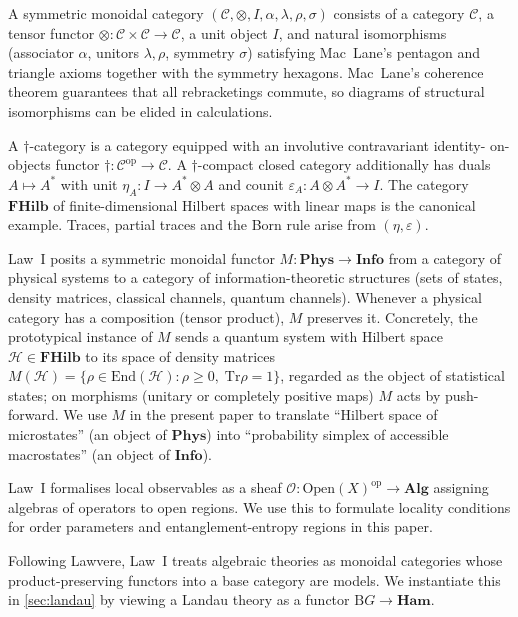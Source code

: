 \documentclass[12pt]{article}
\theoremstyle{plain}
\theoremstyle{definition}
\theoremstyle{remark}
\newcommand{\Ham}{\mathbf{Ham}}
\newcommand{\FHilb}{\mathbf{FHilb}}
\newcommand{\Phys}{\mathbf{Phys}}
\newcommand{\Info}{\mathbf{Info}}
\newcommand{\BG}{\mathrm{B}G}
\newcommand{\Tr}{\mathrm{Tr}}
\begin{document}
\begin{description}[leftmargin=1.5em,style=nextline]
  \item[(L1.1) Symmetric monoidal category]
  A symmetric monoidal category $(\mathcal{C},\otimes,I,\alpha,\lambda,\rho,\sigma)$
  consists of a category $\mathcal{C}$, a tensor functor
  ${\otimes:\mathcal{C}\times\mathcal{C}\to\mathcal{C}}$, a unit object $I$, and natural
  isomorphisms (associator $\alpha$, unitors $\lambda,\rho$, symmetry $\sigma$)
  satisfying Mac~Lane's pentagon and triangle axioms together with the symmetry
  hexagons. Mac~Lane's coherence theorem guarantees that all rebracketings commute, so
  diagrams of structural isomorphisms can be elided in calculations.

  \item[(L1.2) Dagger-compact closed structure]
  A $\dagger$-category is a category equipped with an involutive contravariant identity-
  on-objects functor $\dagger:\mathcal{C}^{\mathrm{op}}\to\mathcal{C}$. A
  $\dagger$-compact closed category additionally has duals
  $A\mapsto A^{*}$ with unit $\eta_{A}:I\to A^{*}\otimes A$ and counit
  $\varepsilon_{A}:A\otimes A^{*}\to I$. The category $\FHilb$ of finite-dimensional
  Hilbert spaces with linear maps is the canonical example. Traces, partial traces and
  the Born rule arise from $(\eta,\varepsilon)$.

  \item[(L1.3) Matter--information functor]
  Law~I posits a symmetric monoidal functor
  $M:\Phys\to\Info$
  from a category of physical systems to a category of information-theoretic structures
  (sets of states, density matrices, classical channels, quantum channels). Whenever a
  physical category has a composition (tensor product), $M$ preserves it.
  Concretely, the prototypical instance of $M$ sends a quantum system with Hilbert
  space $\mathcal{H}\in\FHilb$ to its space of density matrices
  $M(\mathcal{H})=\{\rho\in\mathrm{End}(\mathcal{H}) : \rho\geq 0,\;\Tr\rho=1\}$,
  regarded as the object of statistical states; on morphisms (unitary or completely
  positive maps) $M$ acts by push-forward. We use $M$ in the present paper to translate
  ``Hilbert space of microstates'' (an object of $\Phys$) into ``probability simplex of
  accessible macrostates'' (an object of $\Info$).

  \item[(L1.4) Sheaf semantics of local observables]
  Law~I formalises local observables as a sheaf
  $\mathcal{O}:\mathrm{Open}(X)^{\mathrm{op}}\to\mathbf{Alg}$ assigning algebras of
  operators to open regions. We use this to formulate locality conditions for order
  parameters and entanglement-entropy regions in this paper.

  \item[(L1.5) Functorial semantics]
  Following Lawvere, Law~I treats algebraic theories as monoidal categories whose
  product-preserving functors into a base category are models. We instantiate this in
  \cref{sec:landau} by viewing a Landau theory as a functor $\BG\to\Ham$.
\end{description}
\end{document}
